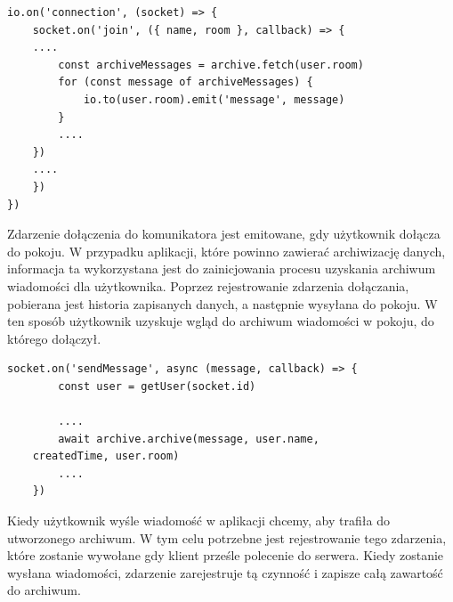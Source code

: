 \begin{lstlisting}[caption={Wykorzystanie zdarzenia dołączenia, aby uzyskać widok zawartości archiwum w aplikacji}]
io.on('connection', (socket) => {
    socket.on('join', ({ name, room }, callback) => {
	....
        const archiveMessages = archive.fetch(user.room)
        for (const message of archiveMessages) {
            io.to(user.room).emit('message', message)
        }
        ....
    })
   	....
    })
})
\end{lstlisting}
Zdarzenie dołączenia do komunikatora jest emitowane, gdy użytkownik dołącza do pokoju. W przypadku aplikacji, które powinno zawierać archiwizację danych, informacja ta wykorzystana jest do zainicjowania procesu uzyskania archiwum wiadomości dla użytkownika. Poprzez rejestrowanie zdarzenia dołączania, pobierana jest historia zapisanych danych, a następnie wysyłana do pokoju. W ten sposób użytkownik uzyskuje wgląd do archiwum wiadomości w pokoju, do którego dołączył.
\begin{lstlisting}[caption=Wykorzystanie zdarzenia wysyłania wiadomości do tworzenia archiwum]
socket.on('sendMessage', async (message, callback) => {
        const user = getUser(socket.id)

      	....
        await archive.archive(message, user.name, 
	createdTime, user.room)
       	....
    })
\end{lstlisting}

Kiedy użytkownik wyśle wiadomość w aplikacji chcemy, aby trafiła do utworzonego archiwum. W tym celu potrzebne jest rejestrowanie tego zdarzenia, które zostanie wywołane gdy klient prześle polecenie do serwera. Kiedy zostanie wysłana wiadomości, zdarzenie zarejestruje tą czynność i zapisze całą zawartość do archiwum. 




